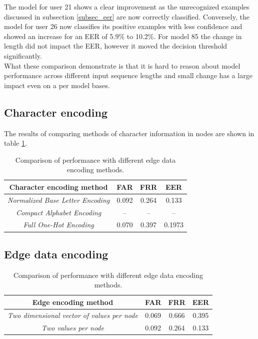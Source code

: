 The model for user 21 shows a clear improvement as the unrecognized examples discussed in subsection \ref{subsec_eer} are now correctly classified. Conversely, the model for user 26 now classifies its positive examples with less confidence and showed an increase for an EER of 5.9\% to 10.2\%. For model 85 the change in length did not impact the EER, however it moved the decision threshold significantly.\\
What these comparison demonstrate is that it is hard to reason about model performance across different input sequence lengths and small change has a large impact even on a per model bases.

\subsection{Character encoding}
The results of comparing methods of character information in nodes are shown in table
\ref{table:char_encoding}.

\begin{center}
	\begin{table}[H]
		\begin{center}
			\begin{tabular}{ |c|c|c|c| } 
				\hline
				Character encoding method & FAR & FRR & EER \\
				\hline
				\textit{Normalized Base Letter Encoding} & 0.092 & 0.264 & 0.133 \\
				\hline
				\textit{Compact Alphabet Encoding} & -- & -- & -- \\
				\hline
				\textit{Full One-Hot Encoding} & 0.070 & 0.397 & 0.1973 \\
				\hline
			\end{tabular}
		\end{center}
		\caption{Comparison of performance with different edge data encoding methods.}
		\label{table:char_encoding}
	\end{table}
\end{center}


\subsection{Edge data encoding}

\begin{center}
	\begin{table}[H]
		\begin{center}
			\begin{tabular}{ |c|c|c|c| } 
				\hline
				Edge encoding method & FAR & FRR & EER \\
				\hline
				\textit{Two dimensional vector of values per node} & 0.069 & 0.666 & 0.395 \\
				\hline
				\textit{Two values per node} & 0.092 & 0.264 & 0.133 \\
				\hline
			\end{tabular}
		\end{center}
		\caption{Comparison of performance with different edge data encoding methods.}
		\label{table:egde_encoding_comp}
	\end{table}
\end{center}

